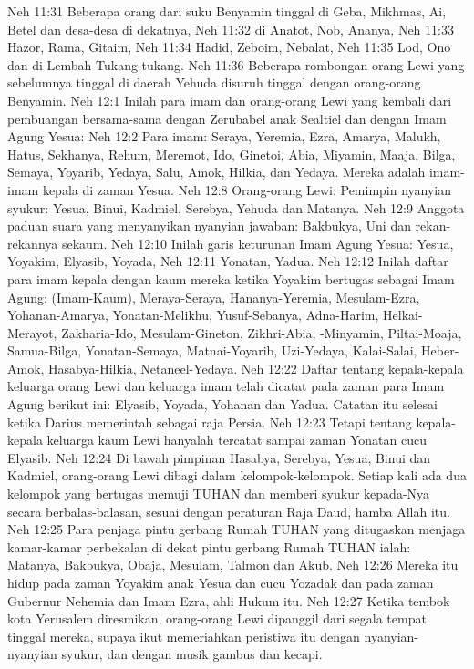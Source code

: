 Neh 11:31  Beberapa orang dari suku Benyamin tinggal di Geba, Mikhmas, Ai, Betel dan desa-desa di dekatnya,
Neh 11:32  di Anatot, Nob, Ananya,
Neh 11:33  Hazor, Rama, Gitaim,
Neh 11:34  Hadid, Zeboim, Nebalat,
Neh 11:35  Lod, Ono dan di Lembah Tukang-tukang.
Neh 11:36  Beberapa rombongan orang Lewi yang sebelumnya tinggal di daerah Yehuda disuruh tinggal dengan orang-orang Benyamin.
Neh 12:1  Inilah para imam dan orang-orang Lewi yang kembali dari pembuangan bersama-sama dengan Zerubabel anak Sealtiel dan dengan Imam Agung Yesua:
Neh 12:2  Para imam: Seraya, Yeremia, Ezra, Amarya, Malukh, Hatus, Sekhanya, Rehum, Meremot, Ido, Ginetoi, Abia, Miyamin, Maaja, Bilga, Semaya, Yoyarib, Yedaya, Salu, Amok, Hilkia, dan Yedaya. Mereka adalah imam-imam kepala di zaman Yesua.
Neh 12:8  Orang-orang Lewi: Pemimpin nyanyian syukur: Yesua, Binui, Kadmiel, Serebya, Yehuda dan Matanya.
Neh 12:9  Anggota paduan suara yang menyanyikan nyanyian jawaban: Bakbukya, Uni dan rekan-rekannya sekaum.
Neh 12:10  Inilah garis keturunan Imam Agung Yesua: Yesua, Yoyakim, Elyasib, Yoyada,
Neh 12:11  Yonatan, Yadua.
Neh 12:12  Inilah daftar para imam kepala dengan kaum mereka ketika Yoyakim bertugas sebagai Imam Agung: (Imam-Kaum), Meraya-Seraya, Hananya-Yeremia, Mesulam-Ezra, Yohanan-Amarya, Yonatan-Melikhu, Yusuf-Sebanya, Adna-Harim, Helkai-Merayot, Zakharia-Ido, Mesulam-Gineton, Zikhri-Abia, -Minyamin, Piltai-Moaja, Samua-Bilga, Yonatan-Semaya, Matnai-Yoyarib, Uzi-Yedaya, Kalai-Salai, Heber-Amok, Hasabya-Hilkia, Netaneel-Yedaya.
Neh 12:22  Daftar tentang kepala-kepala keluarga orang Lewi dan keluarga imam telah dicatat pada zaman para Imam Agung berikut ini: Elyasib, Yoyada, Yohanan dan Yadua. Catatan itu selesai ketika Darius memerintah sebagai raja Persia.
Neh 12:23  Tetapi tentang kepala-kepala keluarga kaum Lewi hanyalah tercatat sampai zaman Yonatan cucu Elyasib.
Neh 12:24  Di bawah pimpinan Hasabya, Serebya, Yesua, Binui dan Kadmiel, orang-orang Lewi dibagi dalam kelompok-kelompok. Setiap kali ada dua kelompok yang bertugas memuji TUHAN dan memberi syukur kepada-Nya secara berbalas-balasan, sesuai dengan peraturan Raja Daud, hamba Allah itu.
Neh 12:25  Para penjaga pintu gerbang Rumah TUHAN yang ditugaskan menjaga kamar-kamar perbekalan di dekat pintu gerbang Rumah TUHAN ialah: Matanya, Bakbukya, Obaja, Mesulam, Talmon dan Akub.
Neh 12:26  Mereka itu hidup pada zaman Yoyakim anak Yesua dan cucu Yozadak dan pada zaman Gubernur Nehemia dan Imam Ezra, ahli Hukum itu.
Neh 12:27  Ketika tembok kota Yerusalem diresmikan, orang-orang Lewi dipanggil dari segala tempat tinggal mereka, supaya ikut memeriahkan peristiwa itu dengan nyanyian-nyanyian syukur, dan dengan musik gambus dan kecapi.
